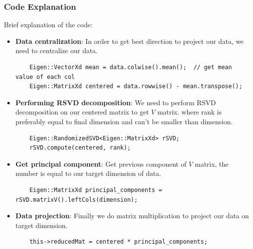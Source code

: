 \documentclass[11pt,a4paper]{article}
\begin{document}
\subsubsection{Code Explanation}
Brief explanation of the code: 
\begin{itemize}
    \item \textbf{Data centralization}: In order to get best direction to project our data, we need to centralize our data.
\begin{verbatim}
    Eigen::VectorXd mean = data.colwise().mean();  // get mean value of each col
    Eigen::MatrixXd centered = data.rowwise() - mean.transpose();
\end{verbatim}
    \item \textbf{Performing RSVD decomposition}: We need to perform RSVD decomposition on our centered matrix to get $V$ matrix. where rank is preferably equal to final dimension and can't be smaller than dimension.
\begin{verbatim}
    Eigen::RandomizedSVD<Eigen::MatrixXd> rSVD;
    rSVD.compute(centered, rank);
\end{verbatim}
    \item \textbf{Get principal component}: Get previous component of $V$ matrix, the number is equal to our target dimension of data.
\begin{verbatim}
    Eigen::MatrixXd principal_components = rSVD.matrixV().leftCols(dimension);
\end{verbatim}
    \item \textbf{Data projection}: Finally we do matrix multiplication to project our data on target dimension.
    \begin{verbatim}
    this->reducedMat = centered * principal_components;
\end{verbatim}

\end{itemize}
\end{document}

